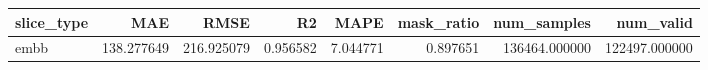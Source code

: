 \begin{tabular}{lrrrrrrr}
\toprule
slice_type & MAE & RMSE & R2 & MAPE & mask_ratio & num_samples & num_valid \\
\midrule
embb & 138.277649 & 216.925079 & 0.956582 & 7.044771 & 0.897651 & 136464.000000 & 122497.000000 \\
\bottomrule
\end{tabular}
